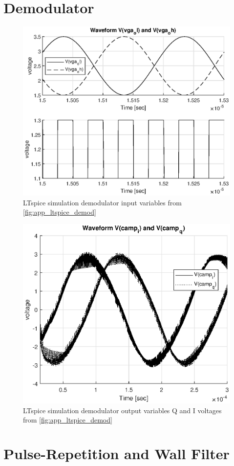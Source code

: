 \section{Demodulator}
\begin{figure}[htbp]
	\centering
	\includegraphics[width=.8\textwidth]{Figures/4_demod_sim_in.eps}
	\caption{LTspice simulation demodulator input variables from \cref{fig:app_ltspice_demod}}
	\label{fig:4_demod_sim_in}
\end{figure}
\begin{figure}[htbp]
	\centering
	\includegraphics[width=.8\textwidth]{Figures/4_demod_sim_out.eps}
	\caption{LTspice simulation demodulator output variables Q and I voltages from \cref{fig:app_ltspice_demod}}
	\label{fig:4_demod_sim_out}
\end{figure}
\section{Pulse-Repetition and Wall Filter}
